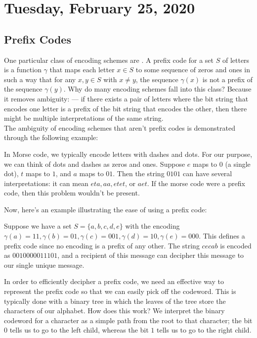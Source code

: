 \newpage
\section{Tuesday, February 25, 2020}


\subsection{Prefix Codes}

One particular class of encoding schemes are . A prefix code for a set $S$ of letters is a function $\gamma$ that maps each letter $x\in S$ to some sequence of zeros and ones in such a way that for any $x, y \in S$ with $x \neq y$, the sequence $\gamma(x)$ is not a prefix of the sequence $\gamma(y)$. Why do many encoding schemes fall into this class? Because it removes ambiguity: --- if there exists a pair of letters where the bit string that encodes one letter is a prefix of the bit string that encodes the other, then there might be multiple interpretations of the same string.  \\

The ambiguity of encoding schemes that aren't prefix codes is demonstrated through the following example:

\begin{example}
 In Morse code, we typically encode letters with dashes and dots. For our purpose, we can think of dots and dashes as zeros and ones. Suppose $e$ maps to $0$ (a single dot), $t$ maps to $1$, and $a$ maps to $01$. Then the string $0101$ can have several interpretations: it can mean $eta, aa, etet$, or $aet$. If the morse code were a prefix code, then this problem wouldn't be present.
\end{example}


Now, here's an example illustrating the ease of using a prefix code:

\begin{example}
 Suppose we have a set $S = \{a, b, c, d, e\}$ with the encoding $\gamma(a) = 11, \gamma(b) = 01, \gamma(c) = 001, \gamma(d) = 10, \gamma(e) = 000$. This defines a prefix code since no encoding is a prefix of any other. The string $cecab$ is encoded as $0010000011101$, and a recipient of this message can decipher this message to our single unique message.
\end{example}

In order to efficiently decipher a prefix code, we need an effective way to represent the prefix code so that we can easily pick off the codeword. This is typically done with a binary tree in which the leaves of the tree store the characters of our alphabet. How does this work? We interpret the binary codeword for a character as a simple path from the root to that character; the bit $0$ tells us to go to the left child, whereas the bit $1$ tells us to go to the right child. \\

